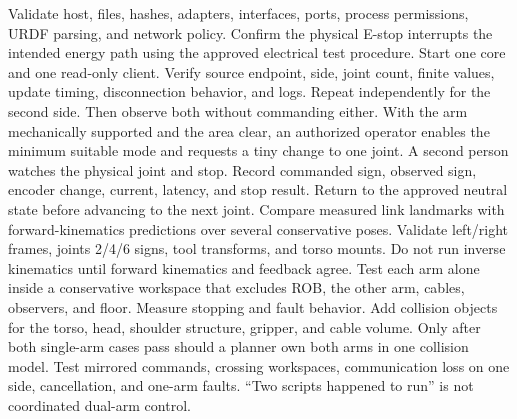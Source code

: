 {}
\markdownRendererSectionEnd \markdownRendererSectionBegin
{}\markdownRendererInterblockSeparator
{}Validate host, files, hashes, adapters, interfaces, ports, process permissions, URDF parsing, and network policy. Confirm the physical E-stop interrupts the intended energy path using the approved electrical test procedure.\markdownRendererInterblockSeparator
{}
\markdownRendererSectionEnd \markdownRendererSectionBegin
{}\markdownRendererInterblockSeparator
{}Start one core and one read-only client. Verify source endpoint, side, joint count, finite values, update timing, disconnection behavior, and logs. Repeat independently for the second side. Then observe both without commanding either.\markdownRendererInterblockSeparator
{}
\markdownRendererSectionEnd \markdownRendererSectionBegin
{}\markdownRendererInterblockSeparator
{}With the arm mechanically supported and the area clear, an authorized operator enables the minimum suitable mode and requests a tiny change to one joint. A second person watches the physical joint and stop. Record commanded sign, observed sign, encoder change, current, latency, and stop result. Return to the approved neutral state before advancing to the next joint.\markdownRendererInterblockSeparator
{}
\markdownRendererSectionEnd \markdownRendererSectionBegin
{}\markdownRendererInterblockSeparator
{}Compare measured link landmarks with forward-kinematics predictions over several conservative poses. Validate left/right frames, joints 2/4/6 signs, tool transforms, and torso mounts. Do not run inverse kinematics until forward kinematics and feedback agree.\markdownRendererInterblockSeparator
{}
\markdownRendererSectionEnd \markdownRendererSectionBegin
{}\markdownRendererInterblockSeparator
{}Test each arm alone inside a conservative workspace that excludes ROB, the other arm, cables, observers, and floor. Measure stopping and fault behavior. Add collision objects for the torso, head, shoulder structure, gripper, and cable volume.\markdownRendererInterblockSeparator
{}
\markdownRendererSectionEnd \markdownRendererSectionBegin
{}\markdownRendererInterblockSeparator
{}Only after both single-arm cases pass should a planner own both arms in one collision model. Test mirrored commands, crossing workspaces, communication loss on one side, cancellation, and one-arm faults. “Two scripts happened to run” is not coordinated dual-arm control.\markdownRendererInterblockSeparator
